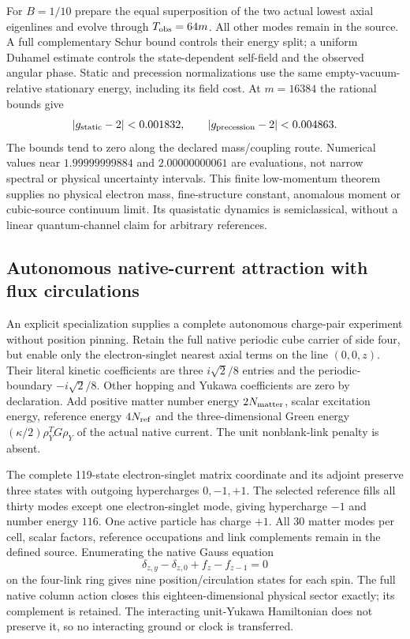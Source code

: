 For $B=1/10$ prepare the equal superposition of the two actual lowest
axial eigenlines and evolve through $T_{\rm obs}=64m$. All other modes
remain in the source. A full complementary Schur bound controls their
energy split; a uniform Duhamel estimate controls the state-dependent
self-field and the observed angular phase. Static and precession
normalizations use the same empty-vacuum-relative stationary energy,
including its field cost. At $m=16384$ the rational bounds give
\[
 |g_{\rm static}-2|<0.001832,\qquad |g_{\rm precession}-2|<0.004863.
\]
The bounds tend to zero along the declared mass/coupling route.
Numerical values near $1.99999999884$ and $2.00000000061$ are evaluations,
not narrow spectral or physical uncertainty intervals. This finite
low-momentum theorem supplies no physical electron mass, fine-structure
constant, anomalous moment or cubic-source continuum limit. Its
quasistatic dynamics is semiclassical, without a linear quantum-channel
claim for arbitrary references.

\subsection{Autonomous native-current attraction with flux circulations}

An explicit specialization supplies a complete autonomous charge-pair
experiment without position pinning. Retain the full native periodic
cube carrier of side four, but enable only the electron-singlet nearest
axial terms on the line $(0,0,z)$. Their literal kinetic coefficients are
three $i\sqrt2/8$ entries and the periodic-boundary $-i\sqrt2/8$.
Other hopping and Yukawa coefficients are zero by declaration. Add
positive matter number energy $2N_{\rm matter}$, scalar excitation energy,
reference energy $4N_{\rm ref}$ and the three-dimensional Green energy
$(\kappa/2)\rho_Y^T G\rho_Y$ of the actual native current. The unit
nonblank-link penalty is absent.

The complete 119-state electron-singlet matrix coordinate and its adjoint
preserve three states with outgoing hypercharges $0,-1,+1$. The selected
reference fills all thirty modes except one electron-singlet mode, giving
hypercharge $-1$ and number energy $116$. One active particle has charge
$+1$. All 30 matter modes per cell, scalar factors, reference occupations
and link complements remain in the defined source. Enumerating the native
Gauss equation
\[
 \delta_{z,y}-\delta_{z,0}+f_z-f_{z-1}=0
\]
on the four-link ring gives nine position/circulation states for each
spin. The full native column action closes this eighteen-dimensional
physical sector exactly; its complement is retained. The interacting
unit-Yukawa Hamiltonian does not preserve it, so no interacting ground
or clock is transferred.

